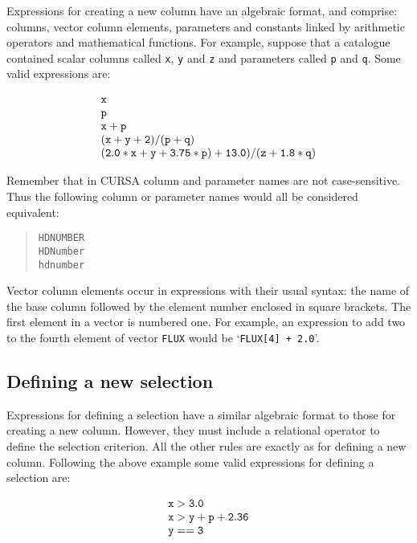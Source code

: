 \documentclass[twoside,11pt]{article}
\renewcommand{\_}{\texttt{\symbol{95}}}
\begin{document}
Expressions for creating a new column have an algebraic format, and comprise:
columns, vector column elements, parameters and constants linked by
arithmetic operators and mathematical functions. For example, suppose that
a catalogue contained scalar columns called {\tt x}, {\tt y} and {\tt z}
and parameters called {\tt p} and {\tt q}.  Some valid expressions are:

\begin{equation}
\begin{array}{l}
{\tt x}  \\
{\tt p}  \\
{\tt x + p}  \\
{\tt (x + y + 2) / (p + q)}  \\
{\tt (2.0*x + y + 3.75*p) + 13.0) / (z + 1.8*q)}
\end{array}
\end{equation}

Remember that in CURSA column and parameter names are not case-sensitive.
Thus the following column or parameter names would all be considered
equivalent:

\begin{verse}
{\tt HD\_NUMBER} \\
{\tt HD\_Number} \\
{\tt hd\_number}
\end{verse}

Vector column elements occur in expressions with their usual syntax:
the name of the base column followed by the element number enclosed
in square brackets. The first element in a vector is numbered one. For
example, an expression to add two to the fourth element of vector
{\tt FLUX} would be `{\tt FLUX[4] + 2.0}'.

\subsection{Defining a new selection}

Expressions for defining a selection have a similar algebraic format to
those for creating a new column.  However, they must include a
relational operator to define the selection criterion.  All the other
rules are exactly as for defining a new column.  Following the above
example some valid expressions for defining a selection are:

\begin{equation}
\begin{array}{l}
{\tt x > 3.0}  \\
{\tt x > y + p + 2.36}  \\
{\tt y == 3}
\end{array}
\end{equation}
\end{document}
